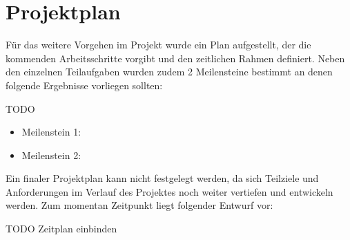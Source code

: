 
\section{Projektplan}
Für das weitere Vorgehen im Projekt wurde ein Plan aufgestellt, der die kommenden Arbeitsschritte vorgibt und den zeitlichen Rahmen definiert. Neben den einzelnen Teilaufgaben wurden zudem 2 Meilensteine bestimmt an denen folgende Ergebnisse vorliegen sollten: 

TODO
\begin{itemize}
   \item Meilenstein 1: 
   \item Meilenstein 2: 
   
\end{itemize}

Ein finaler Projektplan kann nicht festgelegt werden, da sich Teilziele und Anforderungen im Verlauf des Projektes noch weiter vertiefen und entwickeln werden. Zum momentan Zeitpunkt liegt folgender Entwurf vor:

TODO Zeitplan einbinden